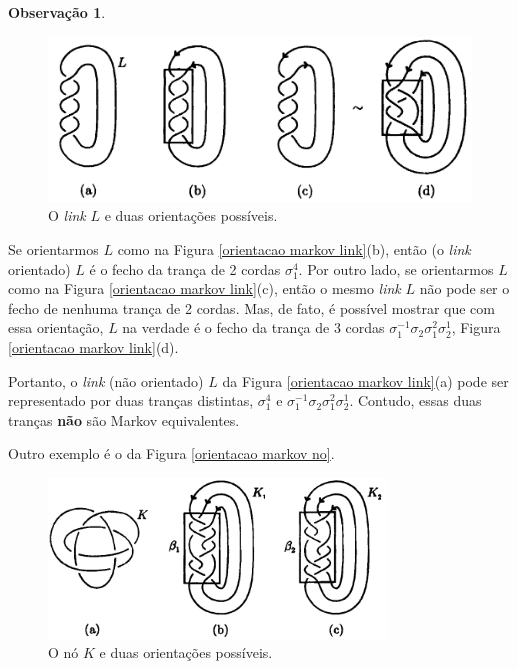 \documentclass[a4paper,portuguese,11pt,twoside, leqno]{book}
\theoremstyle{definition}
\newtheorem{remark}{Observação}[section]
\begin{document}
\begin{remark}
		\begin{figure}[H]
			\begin{center}
				\includegraphics[width=12cm]{orientacao_markov_link.png}
			\end{center}\caption{O \textit{link} $L$ e duas orientações possíveis.}\label{orientacao markov link}
		\end{figure}
		\par\vspace{0.3cm} Se orientarmos $L$ como na Figura \eqref{orientacao markov link}(b), então (o \textit{link} orientado) $L$ é o fecho da trança de 2 cordas $\sigma_1^4$. Por outro lado, se orientarmos $L$ como na Figura \eqref{orientacao markov link}(c), então o mesmo \textit{link} $L$ não pode ser o fecho de nenhuma trança de 2 cordas. Mas, de fato, é possível mostrar que com essa orientação, $L$ na verdade é o fecho da trança de 3 cordas $\sigma_1^{-1}\sigma_2\sigma_1^{2}\sigma_2^{1}$, Figura \eqref{orientacao markov link}(d).
		\par\vspace{0.3cm} Portanto, o \textit{link} (não orientado) $L$ da Figura \eqref{orientacao markov link}(a) pode ser representado por duas tranças distintas, $\sigma_1^4$ e $\sigma_1^{-1}\sigma_2\sigma_1^{2}\sigma_2^{1}$. Contudo, essas duas tranças \textbf{não} são Markov equivalentes. 
		\par\vspace{0.3cm} Outro exemplo é o da Figura \eqref{orientacao markov no}.
		
		\begin{figure}[H]
			\begin{center}
				\includegraphics[width=9cm]{orientacao_markov_no.png}
			\end{center}\caption{O nó $K$ e duas orientações possíveis.}\label{orientacao markov no}
		\end{figure}
		

\end{remark}
\end{document}
